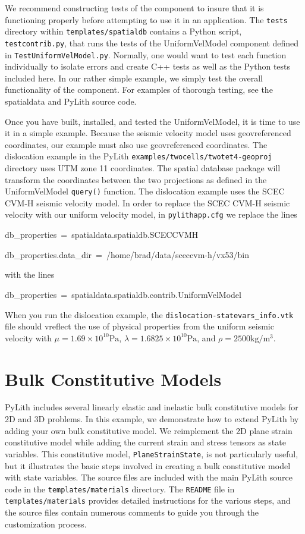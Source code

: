 We recommend constructing tests of the component to insure that it
is functioning properly before attempting to use it in an application.
The \texttt{\small{}tests} directory within \texttt{\small{}templates/spatialdb}
contains a Python script, \texttt{\small{}testcontrib.py}, that runs
the tests of the UniformVelModel component defined in \texttt{\small{}TestUniformVelModel.py}.
Normally, one would want to test each function individually to isolate
errors and create C++ tests as well as the Python tests included here.
In our rather simple example, we simply test the overall functionality
of the component. For examples of thorough testing, see the spatialdata
and PyLith source code.

Once you have built, installed, and tested the UniformVelModel, it
is time to use it in a simple example. Because the seismic velocity
model uses geovreferenced coordinates, our example must also use geovreferenced
coordinates. The dislocation example in the PyLith \texttt{examples/twocells/twotet4-geoproj}
directory uses UTM zone 11 coordinates. The spatial database package
will transform the coordinates between the two projections as defined
in the UniformVelModel \texttt{query()} function. The dislocation
example uses the SCEC CVM-H seismic velocity model. In order to replace
the SCEC CVM-H seismic velocity with our uniform velocity model, in
\texttt{pylithapp.cfg} we replace the lines
\begin{lyxcode}
db\_properties~=~spatialdata.spatialdb.SCECCVMH

db\_properties.data\_dir~=~/home/brad/data/sceccvm-h/vx53/bin
\end{lyxcode}
with the lines
\begin{lyxcode}
db\_properties~=~spatialdata.spatialdb.contrib.UniformVelModel
\end{lyxcode}
When you run the dislocation example, the \texttt{dislocation-statevars\_info.vtk}
file should vreflect the use of physical properties from the uniform
seismic velocity with $\mu=1.69\times10^{10}\mathrm{Pa}$, $\lambda=1.6825\times10^{10}\mathrm{Pa}$,
and $\rho=2500\mathrm{kg/m^{3}}$.


\section{\label{sec:Extending:BulkConstitutiveModels}Bulk Constitutive Models}

PyLith includes several linearly elastic and inelastic bulk constitutive
models for 2D and 3D problems. In this example, we demonstrate how
to extend PyLith by adding your own bulk constitutive model. We reimplement
the 2D plane strain constitutive model while adding the current strain
and stress tensors as state variables. This constitutive model, \texttt{PlaneStrainState},
is not particularly useful, but it illustrates the basic steps involved
in creating a bulk constitutive model with state variables. The source
files are included with the main PyLith source code in the \texttt{templates/materials}
directory. The \texttt{README} file in \texttt{templates/materials}
provides detailed instructions for the various steps, and the source
files contain numerous comments to guide you through the customization
process.

